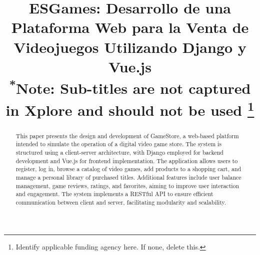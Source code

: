 \documentclass[conference]{IEEEtran}
\begin{document}
\title{ESGames: Desarrollo de una Plataforma Web para la Venta de Videojuegos Utilizando Django y Vue.js\\
{\footnotesize \textsuperscript{*}Note: Sub-titles are not captured in Xplore and
should not be used}
\thanks{Identify applicable funding agency here. If none, delete this.}
}

\author{
\and
{}
\and
{}
\and

}

\maketitle

\begin{abstract}
This paper presents the design and development of GameStore, a web-based platform intended to simulate the operation of a digital video game store. The system is structured using a client-server architecture, with Django employed for backend development and Vue.js for frontend implementation. The application allows users to register, log in, browse a catalog of video games, add products to a shopping cart, and manage a personal library of purchased titles. Additional features include user balance management, game reviews, ratings, and favorites, aiming to improve user interaction and engagement. The system implements a RESTful API to ensure efficient communication between client and server, facilitating modularity and scalability. 
\end{abstract}
\end{document}
